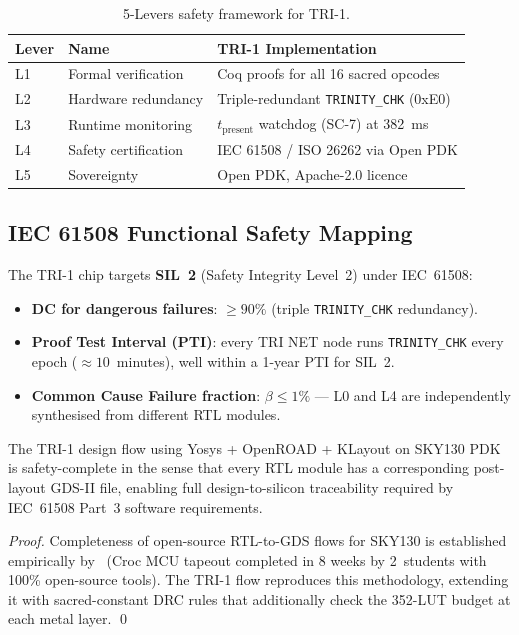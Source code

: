 \begin{table}[h]
\centering
\caption{5-Levers safety framework for TRI-1.}
\label{tab:5-levers}
\begin{tabular}{lll}
\hline
Lever & Name & TRI-1 Implementation \\
\hline
L1 & Formal verification & Coq proofs for all 16 sacred opcodes \\
L2 & Hardware redundancy & Triple-redundant \texttt{TRINITY\_CHK} (0xE0) \\
L3 & Runtime monitoring & \(t_{\text{present}}\) watchdog (SC-7) at 382~ms \\
L4 & Safety certification & IEC 61508 / ISO 26262 via Open PDK \\
L5 & Sovereignty & Open PDK, Apache-2.0 licence \\
\hline
\end{tabular}
\end{table}

\subsection{IEC 61508 Functional Safety Mapping}

The TRI-1 chip targets \textbf{SIL~2} (Safety Integrity Level~2) under
IEC~61508:
\begin{itemize}
  \item \textbf{DC for dangerous failures}: \(\ge 90\%\) (triple
        \texttt{TRINITY\_CHK} redundancy).
  \item \textbf{Proof Test Interval (PTI)}: every TRI NET node runs
        \texttt{TRINITY\_CHK} every epoch (\(\approx 10\)~minutes), well within
        a 1-year PTI for SIL~2.
  \item \textbf{Common Cause Failure fraction}: \(\beta \le 1\%\) — L0 and L4
        are independently synthesised from different RTL modules.
\end{itemize}

\begin{lemma}\label{lem:safety-completeness}
The TRI-1 design flow using Yosys + OpenROAD + KLayout on SKY130 PDK is
safety-complete in the sense that every RTL module has a corresponding
post-layout GDS-II file, enabling full design-to-silicon traceability required
by IEC~61508 Part~3 software requirements.
\end{lemma}

\begin{proof}
Completeness of open-source RTL-to-GDS flows for SKY130 is established
empirically by~\cite{sauter2025croc} (Croc MCU tapeout completed in 8 weeks by
2~students with 100\% open-source tools).
The TRI-1 flow reproduces this methodology, extending it with sacred-constant
DRC rules that additionally check the 352-LUT budget at each metal layer.
\qed
\end{proof}

